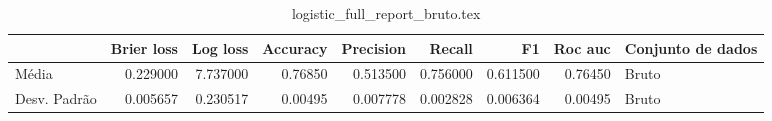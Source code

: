\begin{table}
\centering
\caption{logistic_full_report_bruto.tex}
\label{logistic_full_report_bruto.tex}
\begin{tabular}{lrrrrrrrl}
\toprule
{}           &  Brier  loss &  Log loss &  Accuracy  &  Precision  &   Recall  &       F1  &  Roc auc  & Conjunto de dados \\
\midrule
Média        &     0.229000 &  7.737000 &    0.76850 &    0.513500 &  0.756000 &  0.611500 &   0.76450 &             Bruto \\
Desv. Padrão &     0.005657 &  0.230517 &    0.00495 &    0.007778 &  0.002828 &  0.006364 &   0.00495 &             Bruto \\
\bottomrule
\end{tabular}
\end{table}
